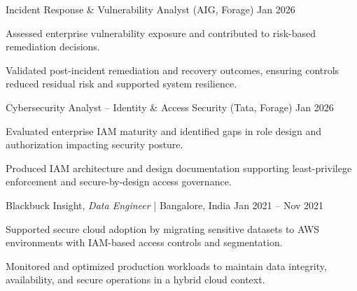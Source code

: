 \begin{cventries2}
  \cventry
    {Incident Response \& Vulnerability Analyst (AIG, Forage)}
    {Jan 2026}
    {
      \begin{cvitems}
        \item {Assessed enterprise vulnerability exposure and contributed to risk-based remediation decisions.}
        \item {Validated post-incident remediation and recovery outcomes, ensuring controls reduced residual risk and supported system resilience.}
      \end{cvitems}
    }
    \vspace{3mm}

  \cventry
    {Cybersecurity Analyst – Identity \& Access Security (Tata, Forage)}
    {Jan 2026}
    {
      \begin{cvitems}
        \item {Evaluated enterprise IAM maturity and identified gaps in role design and authorization impacting security posture.}
        \item {Produced IAM architecture and design documentation supporting least-privilege enforcement and secure-by-design access governance.}
      \end{cvitems}
    }
    \vspace{3mm}

  \cventry
    {Blackbuck Insight, \textnormal{\textit{Data Engineer} | Bangalore, India}}
    {Jan 2021 -- Nov 2021}
    {
      \begin{cvitems}
        \item {Supported secure cloud adoption by migrating sensitive datasets to AWS environments with IAM-based access controls and segmentation.}
        \item {Monitored and optimized production workloads to maintain data integrity, availability, and secure operations in a hybrid cloud context.}
      \end{cvitems}
    }

\end{cventries2}

\vspace{4mm}